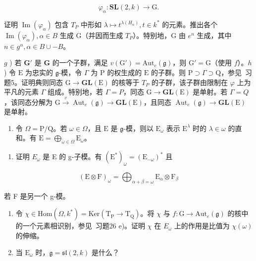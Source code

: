 \[
\varphi_ {\alpha}: \mathbf {SL} (2, k) \to \mathrm{G}.
\]

  证明 \(\operatorname{Im}(\varphi_{\alpha})\) 包含 \(T_{P}\) 中形如 \(\lambda \mapsto t^{\lambda(H_{\alpha})}, t \in k^{*}\) 的元素。推出各个 \(\operatorname{Im}(\varphi_{\alpha}), \alpha \in B\) 生成 G（并因而生成 \(T_{P}\)）。特别地，G 由 \(e^{n}\) 生成，其中 \(n \in g^{\alpha}, \alpha \in B \cup -B\)。

\(g\) ) 若 \(\mathbf{G}'\) 是 \(\mathbf{G}\) 的一个子群，满足 \(v(\mathrm{G}') = \mathrm{Aut}_e(\mathfrak{g})\)，则 \(\mathrm{G}' = \mathrm{G}\)（使用 \(f\)）。\(h\) ) 令 \(\mathrm{E}\) 为忠实的 \(\mathfrak{g}\)-模，令 \(\Gamma\) 为 \(\mathrm{P}\) 的权生成的 \(\mathrm{E}\) 的子群。则 \(\mathrm{P} \supset \Gamma \supset \mathrm{Q}\)，参见~习题5。证明典则同态 \(\mathrm{G} \to \mathbf{GL}(\mathrm{E})\) 的核等于 \(T_{P}\) 的子群，该子群由限制在 \(\varphi\) 上为平凡的元素 \(\varGamma\) 组成。特别地，若 \(\varGamma = P\)，同态 \(\mathrm{G} \to \mathbf{GL}(\mathrm{E})\) 是单射。若 \(\varGamma = Q\)，该同态分解为 \(\mathrm{G} \stackrel{v}{\longrightarrow} \operatorname{Aut}_{e}(\mathfrak{g}) \longrightarrow \mathbf{GL}(\mathrm{E})\)，且同态 \(\operatorname{Aut}_{e}(\mathfrak{g}) \to \mathbf{GL}(\mathrm{E})\) 是单射。

\begin{enumerate}
\def\labelenumi{\arabic{enumi})}
\setcounter{enumi}{26}
\tightlist
\item
  令 \(\Omega = \mathrm{P} / \mathrm{Q}\)。若 \(\omega \in \Omega\)，且 \(\mathrm{E}\) 是 \(\mathfrak{g}\)-模，则以 \(\mathrm{E}_{\omega}\) 表示 \(\mathrm{E}^{\lambda}\) 时的 \(\lambda \in \omega\) 的直和。有 \(\mathrm{E} = \bigoplus_{\omega \in \Omega} \mathrm{E}_{\omega}\)。
\end{enumerate}

\begin{enumerate}
\def\labelenumi{\alph{enumi})}
\tightlist
\item
  证明 \(E_{\omega}\) 是 E 的 g-子模。有 \((\mathrm{E}^{*})_{\omega} = (\mathrm{E}_{-\omega})^{*}\) 且
\end{enumerate}

\[
(\mathrm{E} \otimes \mathrm{F}) _ {\omega} = \bigoplus_ {\alpha + \beta = \omega} \mathrm{E} _ {\alpha} \otimes \mathrm{F} _ {\beta}
\]

若 F 是另一个 g-模。

\begin{enumerate}
\def\labelenumi{\alph{enumi})}
\setcounter{enumi}{1}
\item
  令 \(\chi\in\mathrm{Hom}(\varOmega,k^{*})=\mathrm{Ker}(\mathrm{T}_{\mathrm{P}}\to\mathrm{T}_{\mathrm{Q}})\)。将 \(\chi\) 与 \(f:\mathrm{G}\to\mathrm{Aut}_{e}(\mathfrak{g})\) 的核中的一个元素相识别，参见~习题26 e)。证明 \(\chi\) 在 \(E_{\omega}\) 上的作用是比值为 \(\chi(\omega)\) 的伸缩。
\item
  当 \(\mathrm{E}_{\omega}\) 时，\(\mathfrak{g} = \mathfrak{sl}(2,k)\) 是什么？
\end{enumerate}

